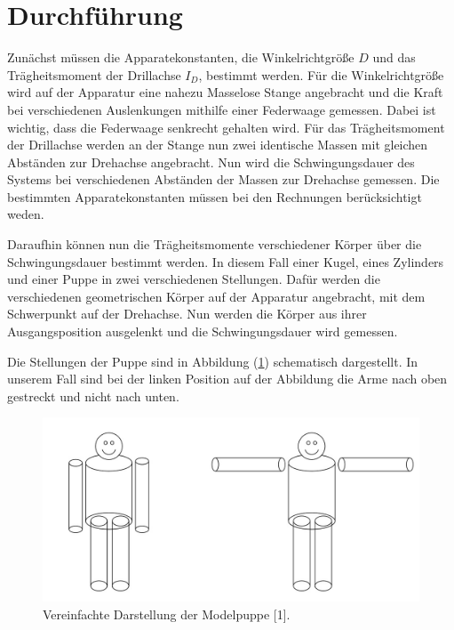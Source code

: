 \section{Durchführung}
Zunächst müssen die Apparatekonstanten, die Winkelrichtgröße $D$ und das Trägheitsmoment
der Drillachse $I_D$, bestimmt werden. Für die Winkelrichtgröße wird auf der Apparatur
eine nahezu Masselose Stange angebracht und die Kraft bei verschiedenen Auslenkungen
mithilfe einer Federwaage gemessen. Dabei ist wichtig, dass die Federwaage senkrecht gehalten wird.
Für das Trägheitsmoment der Drillachse werden an der Stange nun zwei identische Massen mit
gleichen Abständen zur Drehachse angebracht. Nun wird die Schwingungsdauer des Systems
bei verschiedenen Abständen der Massen zur Drehachse gemessen.
Die bestimmten Apparatekonstanten müssen bei den Rechnungen berücksichtigt weden.

Daraufhin können nun die Trägheitsmomente verschiedener Körper über die Schwingungsdauer
bestimmt werden. In diesem Fall einer Kugel, eines Zylinders und einer Puppe in
zwei verschiedenen Stellungen. Dafür werden die verschiedenen geometrischen Körper
auf der Apparatur angebracht, mit dem Schwerpunkt auf der Drehachse. Nun werden die Körper
aus ihrer Ausgangsposition ausgelenkt und die Schwingungsdauer wird gemessen.

Die Stellungen der Puppe sind in Abbildung (\ref{fig:Abb3}) schematisch dargestellt. In unserem Fall
sind bei der linken Position auf der Abbildung die Arme nach oben gestreckt und nicht nach unten.

\begin{figure}
  \includegraphics[width=\textwidth]{Bild3.jpg}
  \caption{Vereinfachte Darstellung der Modelpuppe [1].}
  \label{fig:Abb3}
\end{figure}
